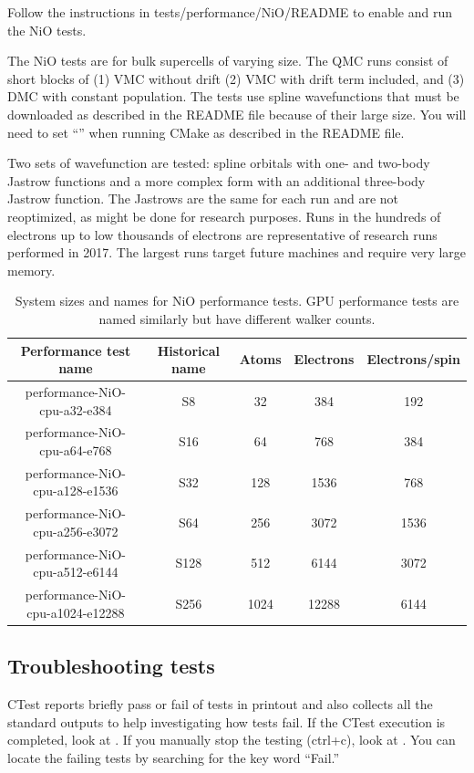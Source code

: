 Follow the instructions in tests/performance/NiO/README to
enable and run the NiO tests.

The NiO tests are for bulk supercells of varying size. The QMC runs consist of short blocks of (1) VMC
without drift (2) VMC with drift term included, and (3) DMC with
constant population. The tests use spline wavefunctions that must be
downloaded as described in the README file because of their large size. You
will need to set ``''
when running CMake as
described in the README file.

Two sets of wavefunction are tested: spline orbitals with one- and
two-body Jastrow functions and a more complex form with an additional
three-body Jastrow function. The Jastrows are the same for each run
and are not reoptimized, as might be done for research purposes.  Runs
in the hundreds of electrons up to low thousands of electrons are representative of
research runs performed in 2017. The largest runs target
future machines and require very large memory.

\begin{table}[h]
\begin{center}
  \caption{System sizes and names for NiO performance tests. GPU performance
    tests are named similarly but have different walker counts.}
\begin{tabular}{|c|c|c|c|c|}
\hline
\bfseries Performance test name&  \bfseries Historical name &\bfseries Atoms& \bfseries Electrons&  \bfseries Electrons/spin \\
\hline
performance-NiO-cpu-a32-e384  & S8 & 32 & 384 & 192 \\
performance-NiO-cpu-a64-e768  & S16 & 64 & 768 & 384 \\
performance-NiO-cpu-a128-e1536 & S32 & 128 & 1536 & 768 \\
performance-NiO-cpu-a256-e3072 & S64 & 256 & 3072 & 1536 \\
performance-NiO-cpu-a512-e6144 & S128 & 512 & 6144 & 3072 \\
performance-NiO-cpu-a1024-e12288& S256 & 1024 & 12288 & 6144 \\
\hline
\end{tabular}

  \label{tab:niotests}
\end{center}
\end{table}

\subsection{Troubleshooting tests}
CTest reports briefly pass or fail of tests in printout and also collects all the standard outputs to help investigating how tests fail.
If the CTest execution is completed, look at .
If you manually stop the testing (ctrl+c), look at .
You can locate the failing tests by searching for the key word ``Fail.''

